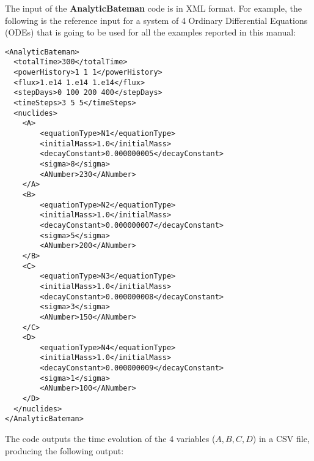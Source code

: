 The input of the \textbf{AnalyticBateman} code is in XML format.
For example, the following is the reference input for a system of 4 Ordinary Differential Equations (ODEs) that is going to be used for all the examples reported in this manual:

\begin{lstlisting}[style=XML]
<AnalyticBateman>
  <totalTime>300</totalTime>
  <powerHistory>1 1 1</powerHistory>
  <flux>1.e14 1.e14 1.e14</flux>
  <stepDays>0 100 200 400</stepDays>
  <timeSteps>3 5 5</timeSteps>
  <nuclides>
    <A>
        <equationType>N1</equationType>
        <initialMass>1.0</initialMass>
        <decayConstant>0.000000005</decayConstant>
        <sigma>8</sigma>
        <ANumber>230</ANumber>
    </A>
    <B>
        <equationType>N2</equationType>
        <initialMass>1.0</initialMass>
        <decayConstant>0.000000007</decayConstant>
        <sigma>5</sigma>
        <ANumber>200</ANumber>
    </B>
    <C>
        <equationType>N3</equationType>
        <initialMass>1.0</initialMass>
        <decayConstant>0.000000008</decayConstant>
        <sigma>3</sigma>
        <ANumber>150</ANumber>
    </C>
    <D>
        <equationType>N4</equationType>
        <initialMass>1.0</initialMass>
        <decayConstant>0.000000009</decayConstant>
        <sigma>1</sigma>
        <ANumber>100</ANumber>
    </D>
  </nuclides>
</AnalyticBateman>
\end{lstlisting}
The code outputs the time evolution of the 4 variables ($A,B,C,D$) in a CSV file, producing the following output:
